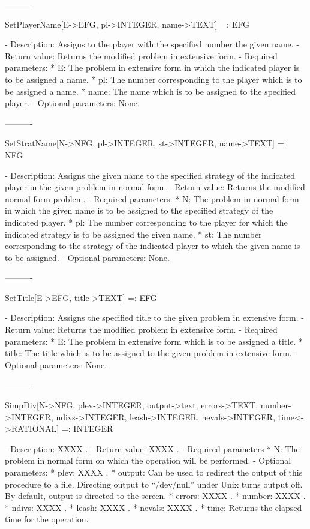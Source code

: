 ----------

SetPlayerName[E->EFG, pl->INTEGER, name->TEXT] =: EFG

   -	Description:  Assigns to the player with the specified number the given
	name.
   -	Return value:  Returns the modified problem in extensive form.
   -	Required parameters:
	  *  E:  The problem in extensive form in which the indicated player is
		to be assigned a name.
	  *  pl:  The number corresponding to the player which is to be 
		assigned a name.
	  *  name:  The name which is to be assigned to the specified player.
   -	Optional parameters:  None.

----------

SetStratName[N->NFG, pl->INTEGER, st->INTEGER, name->TEXT] =: NFG

   -	Description:  Assigns the given name to the specified strategy of the
	indicated player in the given problem in normal form.
   -	Return value:  Returns the modified normal form problem.
   -	Required parameters:
	  *  N:  The problem in normal form in which the given name is to be
		assigned to the specified strategy of the indicated player.
	  *  pl:  The number corresponding to the player for which the 
		indicated strategy is to be assigned the given name.
	  *  st:  The number corresponding to the strategy of the indicated 
		player to which the given name is to be assigned.
   -	Optional parameters:  None.

----------

SetTitle[E->EFG, title->TEXT] =: EFG

   -	Description:  Assigns the specified title to the given problem in 
	extensive form.
   -	Return value:  Returns the modified problem in extensive form.
   -	Required parameters:
	  *  E:  The problem in extensive form which is to be assigned a title.
	  *  title:  The title which is to be assigned to the given problem in 
		extensive form.
  -	Optional parameters:  None.

----------

SimpDiv[N->NFG, {plev->INTEGER}, {output->text}, {errors->TEXT},
	{number->INTEGER}, {ndivs->INTEGER}, {leash->INTEGER}, 
	{nevals->INTEGER}, {time<->RATIONAL}] =: INTEGER

   -	Description:  XXXX .
   -	Return value:  XXXX .
   -	Required parameters
	  *  N:  The problem in normal form on which the operation will be 
		performed.
   -	Optional parameters:
	  *  plev: XXXX .
	  *  output:  Can be used to redirect the output of this procedure to a
		file.  Directing output to ``/dev/null'' under Unix turns 
		output off.  By default, output is directed to the screen.
	  *  errors:  XXXX .
	  *  number:  XXXX .
	  *  ndivs:  XXXX .
	  *  leash:  XXXX .
	  *  nevals:  XXXX .
	  *  time:  Returns the elapsed time for the operation.

